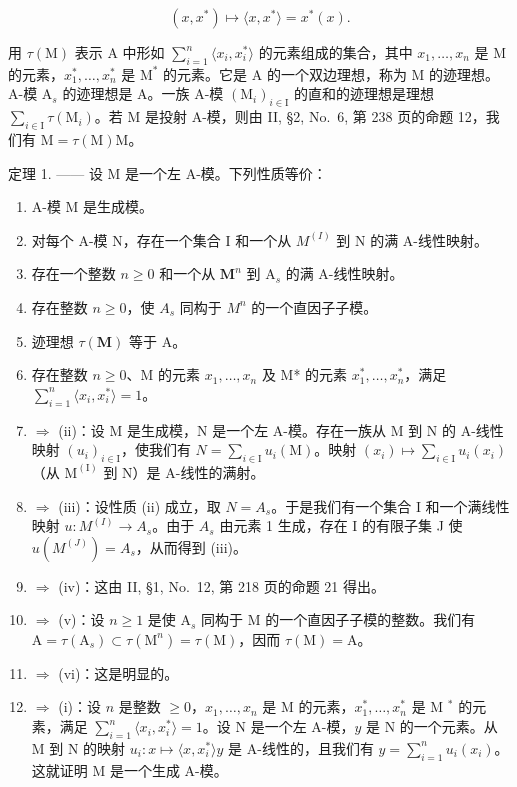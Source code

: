 \[
(x, x ^ {*}) \mapsto \langle x, x ^ {*} \rangle = x ^ {*} (x).
\]

用 \(\tau(\mathrm{M})\) 表示 A 中形如 \(\sum_{i=1}^{n}\langle x_i,x_i^*\rangle\) 的元素组成的集合，其中 \(x_1,\ldots ,x_n\) 是 M 的元素，\(x_1^*,\ldots ,x_n^*\) 是 \(\mathrm{M}^*\) 的元素。它是 A 的一个双边理想，称为 M 的迹理想。A-模 \(\mathrm{A}_s\) 的迹理想是 A。一族 A-模 \((\mathrm{M}_i)_{i\in \mathrm{I}}\) 的直和的迹理想是理想 \(\sum_{i\in \mathrm{I}}\tau(\mathrm{M}_i)\)。若 M 是投射 A-模，则由 II, §2, No.~6, 第 238 页的命题 12，我们有 \(\mathrm{M} = \tau(\mathrm{M})\mathrm{M}\)。

定理 1. —— 设 M 是一个左 A-模。下列性质等价：

\begin{enumerate}
\def\labelenumi{(\roman{enumi})}
\item
  A-模 M 是生成模。
\item
  对每个 A-模 N，存在一个集合 I 和一个从 \(M^{(I)}\) 到 N 的满 A-线性映射。
\item
  存在一个整数 \(n \geqslant 0\) 和一个从 \(\mathbf{M}^n\) 到 \(\mathrm{A}_s\) 的满 A-线性映射。
\item
  存在整数 \(n \geqslant 0\)，使 \(A_s\) 同构于 \(M^n\) 的一个直因子子模。
\item
  迹理想 \(\tau (\mathbf{M})\) 等于 A。
\item
  存在整数 \(n \geqslant 0\)、M 的元素 \(x_{1}, \ldots, x_{n}\) 及 M* 的元素 \(x_{1}^{*}, \ldots, x_{n}^{*}\)，满足 \(\sum_{i=1}^{n} \langle x_{i}, x_{i}^{*} \rangle = 1\)。
\item
  \(\Rightarrow\) (ii)：设 M 是生成模，N 是一个左 A-模。存在一族从 M 到 N 的 A-线性映射 \((u_{i})_{i\in\mathrm{I}}\)，使我们有 \(N=\sum_{i\in\mathrm{I}}u_{i}(\mathrm{M})\)。映射 \((x_{i})\mapsto\sum_{i\in\mathrm{I}}u_{i}(x_{i})\)（从 \(\mathrm{M}^{(\mathrm{I})}\) 到 N）是 A-线性的满射。
\item
  \(\Rightarrow\) (iii)：设性质 (ii) 成立，取 \(N = A_s\)。于是我们有一个集合 I 和一个满线性映射 \(u: M^{(I)} \to A_s\)。由于 \(A_s\) 由元素 1 生成，存在 I 的有限子集 J 使 \(u(M^{(J)}) = A_s\)，从而得到 (iii)。
\item
  \(\Rightarrow\) (iv)：这由 II, §1, No.~12, 第 218 页的命题 21 得出。
\item
  \(\Rightarrow\) (v)：设 \(n \geqslant 1\) 是使 \(\mathrm{A}_s\) 同构于 M 的一个直因子子模的整数。我们有 \(\mathrm{A} = \tau(\mathrm{A}_s) \subset \tau(\mathrm{M}^n) = \tau(\mathrm{M})\)，因而 \(\tau(\mathrm{M}) = \mathrm{A}\)。
\item
  \(\Rightarrow\) (vi)：这是明显的。
\item
  \(\Rightarrow\) (i)：设 \(n\) 是整数 \(\geqslant 0\)，\(x_{1},\ldots ,x_{n}\) 是 M 的元素，\(x_{1}^{*},\ldots ,x_{n}^{*}\) 是 M \(^*\) 的元素，满足 \(\sum_{i = 1}^{n}\langle x_i,x_i^*\rangle = 1\)。设 N 是一个左 A-模，\(y\) 是 N 的一个元素。从 M 到 N 的映射 \(u_{i}:x\mapsto \langle x,x_{i}^{*}\rangle y\) 是 A-线性的，且我们有 \(y = \sum_{i = 1}^{n}u_{i}(x_{i})\)。这就证明 M 是一个生成 A-模。
\end{enumerate}

